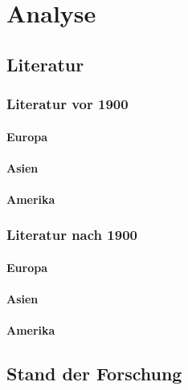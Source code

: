\chapter{Analyse}

\section{Literatur}
\subsection{Literatur vor 1900}


\subsubsection{Europa}

\blindtext 

\blindtext

\blindtext

\subsubsection{Asien}

\blindtext 

\blindtext

\blindtext

\subsubsection{Amerika}

\blindtext 

\blindtext

\blindtext

\subsection{Literatur nach 1900}

\subsubsection{Europa}

\blindtext 

\blindtext

\blindtext

\subsubsection{Asien}

\blindtext 

\blindtext

\blindtext

\subsubsection{Amerika}

\blindtext 

\blindtext

\blindtext


\section{Stand der Forschung}

\blindtext 

\blindtext

\blindtext